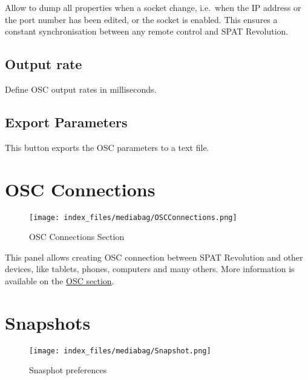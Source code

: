 \documentclass[
  letterpaper,
  DIV=11,
  numbers=noendperiod]{scrreport}
\begin{document}
Allow to dump all properties when a socket change, i.e.~when the IP
address or the port number has been edited, or the socket is enabled.
This ensures a constant synchronisation between any remote control and
SPAT Revolution.

\hypertarget{output-rate}{%
\subsection{Output rate}\label{output-rate}}

Define OSC output rates in milliseconds.

\hypertarget{export-parameters}{%
\subsection{Export Parameters}\label{export-parameters}}

This button exports the OSC parameters to a text file.

\hypertarget{osc-connections}{%
\section{OSC Connections}\label{osc-connections}}

\begin{figure}

{\centering \texttt{[image: index\_files/mediabag/OSCConnections.png]}

}

\caption{OSC Connections Section}

\end{figure}

This panel allows creating OSC connection between SPAT Revolution and
other devices, like tablets, phones, computers and many others. More
information is available on the
\href{Ecosystem_\&_integration_OSC_Connections_Matrix.md}{OSC section}.

\hypertarget{snapshots}{%
\section{Snapshots}\label{snapshots}}

\begin{figure}

{\centering \texttt{[image: index\_files/mediabag/Snapshot.png]}

}

\caption{Snasphot preferences}

\end{figure}
\end{document}
